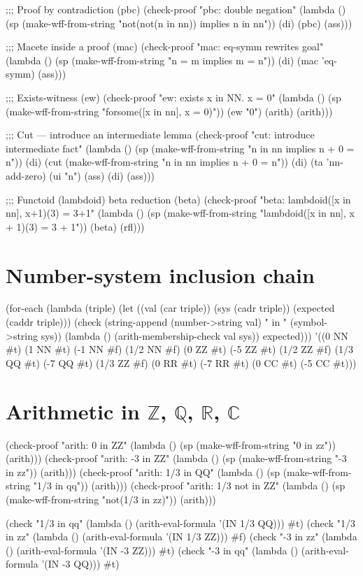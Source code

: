 \begin{VNBcode}
;;; Proof by contradiction (pbc)
(check-proof "pbc: double negation"
  (lambda ()
    (sp (make-wff-from-string "not(not(n in nn)) implies n in nn"))
    (di) (pbc) (ass)))

;;; Macete inside a proof (mac)
(check-proof "mac: eq-symm rewrites goal"
  (lambda ()
    (sp (make-wff-from-string "n = m implies m = n"))
    (di) (mac 'eq-symm) (ass)))

;;; Exists-witness (ew)
(check-proof "ew: exists x in NN. x = 0"
  (lambda ()
    (sp (make-wff-from-string "forsome([x in nn], x = 0)"))
    (ew "0") (arith) (arith)))

;;; Cut — introduce an intermediate lemma
(check-proof "cut: introduce intermediate fact"
  (lambda ()
    (sp (make-wff-from-string "n in nn implies n + 0 = n"))
    (di)
    (cut (make-wff-from-string "n in nn implies n + 0 = n"))
    (di) (ta 'nn-add-zero) (ui "n") (ass)
    (di) (ass)))

;;; Functoid (lambdoid) beta reduction (beta)
(check-proof "beta: lambdoid([x in nn], x+1)(3) = 3+1"
  (lambda ()
    (sp (make-wff-from-string "lambdoid([x in nn], x + 1)(3) = 3 + 1"))
    (beta) (rfl)))
\end{VNBcode}

\section{Number-system inclusion chain}

\begin{VNBcode}
(for-each
  (lambda (triple)
    (let ((val (car triple)) (sys (cadr triple)) (expected (caddr triple)))
      (check (string-append (number->string val) " in " (symbol->string sys))
             (lambda () (arith-membership-check val sys))
             expected)))
  '((0    NN #t)  (1    NN #t)  (-1   NN #f)  (1/2  NN #f)
    (0    ZZ #t)  (-5   ZZ #t)  (1/2  ZZ #f)
    (1/3  QQ #t)  (-7   QQ #t)  (1/3  ZZ #f)
    (0    RR #t)  (-7   RR #t)
    (0    CC #t)  (-5   CC #t)))
\end{VNBcode}

\section{Arithmetic in \texorpdfstring{$\mathbb{Z}$, $\mathbb{Q}$, $\mathbb{R}$, $\mathbb{C}$}{Z, Q, R, C}}

\begin{VNBcode}
(check-proof "arith: 0 in ZZ"
  (lambda () (sp (make-wff-from-string "0 in zz")) (arith)))
(check-proof "arith: -3 in ZZ"
  (lambda () (sp (make-wff-from-string "-3 in zz")) (arith)))
(check-proof "arith: 1/3 in QQ"
  (lambda () (sp (make-wff-from-string "1/3 in qq")) (arith)))
(check-proof "arith: 1/3 not in ZZ"
  (lambda () (sp (make-wff-from-string "not(1/3 in zz)")) (arith)))

(check "1/3 in qq" (lambda () (arith-eval-formula '(IN 1/3 QQ)))  #t)
(check "1/3 in zz" (lambda () (arith-eval-formula '(IN 1/3 ZZ)))  #f)
(check "-3 in zz"  (lambda () (arith-eval-formula '(IN -3 ZZ)))   #t)
(check "-3 in qq"  (lambda () (arith-eval-formula '(IN -3 QQ)))   #t)
\end{VNBcode}

